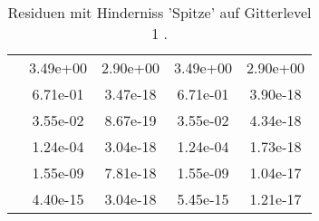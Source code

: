 \begin{table}
\begin{tabular}{c|cc|cc|}
\multicolumn{1}{|c|}{} & \multicolumn{1}{|c|}{  3.49e+00} & \multicolumn{1}{|c|}{  2.90e+00} & \multicolumn{1}{|c|}{  3.49e+00} & \multicolumn{1}{|c|}{  2.90e+00} \\ 
\multicolumn{1}{|c|}{} & \multicolumn{1}{|c|}{  6.71e-01} & \multicolumn{1}{|c|}{  3.47e-18} & \multicolumn{1}{|c|}{  6.71e-01} & \multicolumn{1}{|c|}{  3.90e-18} \\ 
\multicolumn{1}{|c|}{} & \multicolumn{1}{|c|}{  3.55e-02} & \multicolumn{1}{|c|}{  8.67e-19} & \multicolumn{1}{|c|}{  3.55e-02} & \multicolumn{1}{|c|}{  4.34e-18} \\ 
\multicolumn{1}{|c|}{} & \multicolumn{1}{|c|}{  1.24e-04} & \multicolumn{1}{|c|}{  3.04e-18} & \multicolumn{1}{|c|}{  1.24e-04} & \multicolumn{1}{|c|}{  1.73e-18} \\ 
\multicolumn{1}{|c|}{} & \multicolumn{1}{|c|}{  1.55e-09} & \multicolumn{1}{|c|}{  7.81e-18} & \multicolumn{1}{|c|}{  1.55e-09} & \multicolumn{1}{|c|}{  1.04e-17} \\ 
\multicolumn{1}{|c|}{} & \multicolumn{1}{|c|}{  4.40e-15} & \multicolumn{1}{|c|}{  3.04e-18} & \multicolumn{1}{|c|}{  5.45e-15} & \multicolumn{1}{|c|}{  1.21e-17} \\ 
\hline 
\end{tabular}\caption{Residuen mit Hinderniss 'Spitze' auf Gitterlevel 1 .}\label{tab:Residuum_Spitze_level1}
\end{table} 
